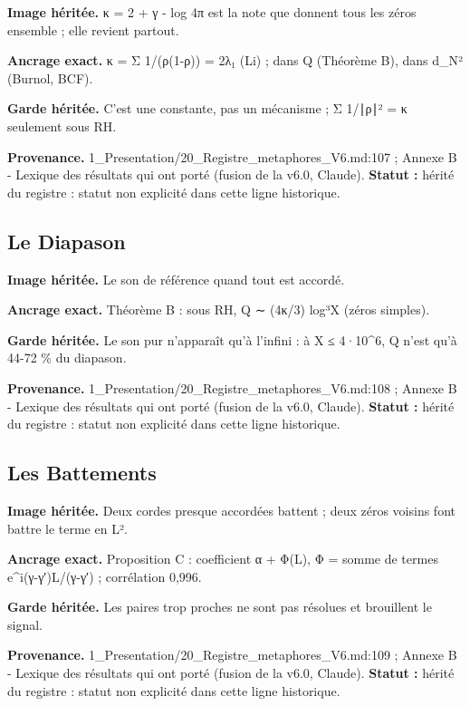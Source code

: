 \documentclass[
  9pt,
  a4paper,
]{article}
\begin{document}
\textbf{Image héritée.} κ = 2 + γ - log 4π est la note que donnent tous
les zéros ensemble ; elle revient partout.

\textbf{Ancrage exact.} κ = Σ 1/(ρ(1-ρ)) = 2λ₁ (Li) ; dans Q (Théorème
B), dans d\_N² (Burnol, BCF).

\textbf{Garde héritée.} C'est une constante, pas un mécanisme ; Σ 1/∣ρ∣²
= κ seulement sous RH.

\textbf{Provenance.} 1\_Presentation/20\_Registre\_metaphores\_V6.md:107
; Annexe B - Lexique des résultats qui ont porté (fusion de la v6.0,
Claude). \textbf{Statut :} hérité du registre : statut non explicité
dans cette ligne historique.

\hypertarget{le-diapason}{%
\subsection{Le Diapason}\label{le-diapason}}

\textbf{Image héritée.} Le son de référence quand tout est accordé.

\textbf{Ancrage exact.} Théorème B : sous RH, Q ∼ (4κ/3) log³X (zéros
simples).

\textbf{Garde héritée.} Le son pur n'apparaît qu'à l'infini : à X ≤
4·10\^{}6, Q n'est qu'à 44-72 \% du diapason.

\textbf{Provenance.} 1\_Presentation/20\_Registre\_metaphores\_V6.md:108
; Annexe B - Lexique des résultats qui ont porté (fusion de la v6.0,
Claude). \textbf{Statut :} hérité du registre : statut non explicité
dans cette ligne historique.

\hypertarget{les-battements}{%
\subsection{Les Battements}\label{les-battements}}

\textbf{Image héritée.} Deux cordes presque accordées battent ; deux
zéros voisins font battre le terme en L².

\textbf{Ancrage exact.} Proposition C : coefficient α + Φ(L), Φ = somme
de termes e\^{}i(γ-γ′)L/(γ-γ′) ; corrélation 0,996.

\textbf{Garde héritée.} Les paires trop proches ne sont pas résolues et
brouillent le signal.

\textbf{Provenance.} 1\_Presentation/20\_Registre\_metaphores\_V6.md:109
; Annexe B - Lexique des résultats qui ont porté (fusion de la v6.0,
Claude). \textbf{Statut :} hérité du registre : statut non explicité
dans cette ligne historique.
\end{document}
